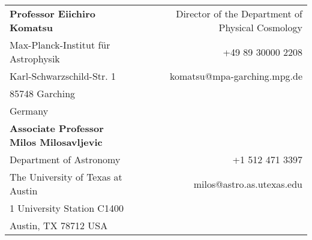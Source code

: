 \begin{tabular*}{159.2mm}{@{\extracolsep{\fill}}lr}
%
\textbf{Professor Eiichiro Komatsu} &
Director of the Department of Physical Cosmology\\
Max-Planck-Institut f\"ur Astrophysik      & +49 89 30000 2208\\
Karl-Schwarzschild-Str. 1                  & komatsu@mpa-garching.mpg.de\\
85748 Garching                             &\\
Germany                                    &\vspace{5mm}\\
%
\textbf{Associate Professor Milos Milosavljevic} & \\
Department of Astronomy            &  +1 512 471 3397\\
The University of Texas at Austin  &  milos@astro.as.utexas.edu\\
1 University Station C1400         &  \\
Austin, TX 78712 USA               & \vspace{5mm}\\

\end{tabular*}
